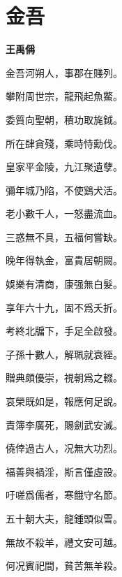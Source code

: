 \documentclass[12pt,a4paper]{ctexbook}
\begin{document}
\section{金吾}
\textbf{王禹偁}\par\vspace{0.5em}
金吾河朔人，事郡在賤列。\par
攀附周世宗，龍飛起魚鱉。\par
委質向聖朝，積功取旄鉞。\par
所在肆貪殘，乘時恃勳伐。\par
皇家平金陵，九江聚遺孽。\par
彌年城乃陷，不使鷄犬活。\par
老小數千人，一怒盡流血。\par
三惑無不具，五福何嘗缺。\par
晚年得執金，富貴居朝闕。\par
娛樂有清商，康强無白髮。\par
享年六十九，固不爲夭折。\par
考終北牖下，手足全啟發。\par
子孫十數人，解珮就衰絰。\par
贈典頗優崇，視朝爲之輟。\par
哀榮既如是，報應何足說。\par
責簿李廣死，賜劍武安滅。\par
僥倖過古人，况無大功烈。\par
福善與禍淫，斯言僅虛設。\par
吁嗟爲儒者，寒餓守名節。\par
五十朝大夫，龍鍾頭似雪。\par
無故不殺羊，禮文安可越。\par
何况賓祀間，貧苦無羊殺。\par
\end{document}
